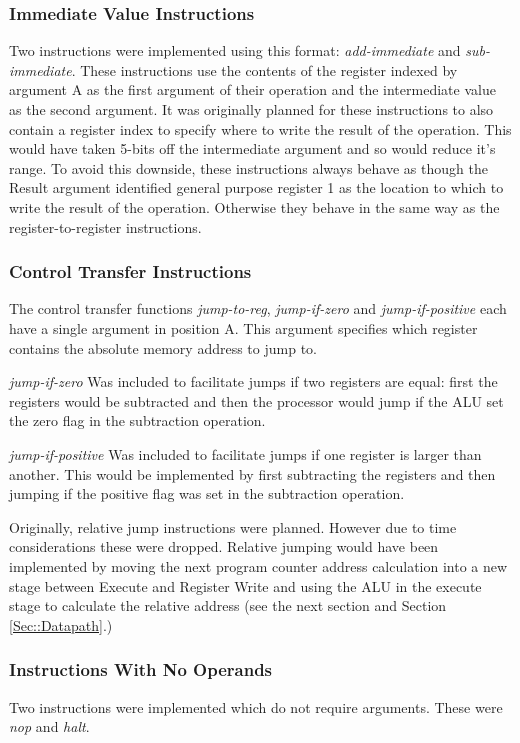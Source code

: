 \documentclass[11pt,a4paper]{IEEEtran}
\begin{document}
			\subsubsection{Immediate Value Instructions}
				Two instructions were implemented using this format: \textit{add-immediate} and \textit{sub-immediate}. These instructions use the contents of the register indexed by argument A as the first argument of their operation and the intermediate value as the second argument. It was originally planned for these instructions to also contain a register index to specify where to write the result of the operation. This would have taken 5-bits off the intermediate argument and so would reduce it's range. To avoid this downside, these instructions always behave as though the Result argument identified general purpose register 1 as the location to which to write the result of the operation. Otherwise they behave in the same way as the register-to-register instructions. 
			
			\subsubsection{Control Transfer Instructions}
			The control transfer functions \textit{jump-to-reg}, \textit{jump-if-zero} and \textit{jump-if-positive} each have a single argument in position A. This argument specifies which register contains the absolute memory address to jump to. 
			
			\textit{jump-if-zero} Was included to facilitate jumps if two registers are equal: first the registers would be subtracted and then the processor would jump if the ALU set the zero flag in the subtraction operation. 
			
			\textit{jump-if-positive} Was included to facilitate jumps if one register is larger than another. This would be implemented by first subtracting the registers and then jumping if the positive flag was set in the subtraction operation. 
			
			Originally, relative jump instructions were planned. However due to time considerations these were dropped. Relative jumping would have been implemented by moving the next program counter address calculation into a new stage between Execute and Register Write and using the ALU in the execute stage to calculate the relative address (see the next section and Section \ref{Sec::Datapath}.) 
				
			\subsubsection{Instructions With No Operands}
				Two instructions were implemented which do not require arguments. These were \textit{nop} and \textit{halt}.
				
\end{document}
